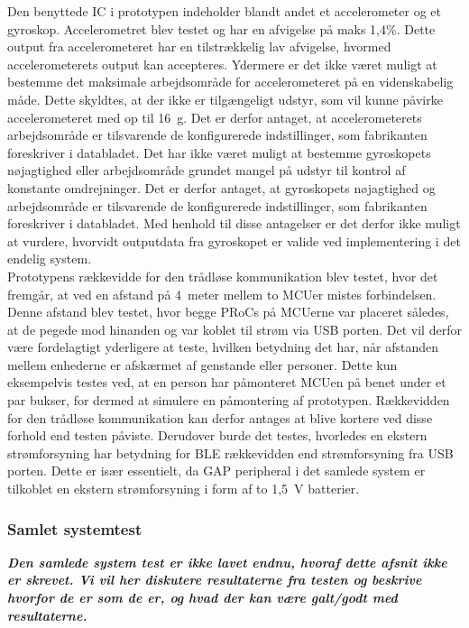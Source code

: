 Den benyttede IC i prototypen indeholder blandt andet et accelerometer og et gyroskop. Accelerometret blev testet og har en afvigelse på maks 1,4\%. Dette output fra accelerometeret har en tilstrækkelig lav afvigelse, hvormed accelerometerets output kan accepteres. Ydermere er det ikke været muligt at bestemme det maksimale arbejdsområde for accelerometeret på en videnskabelig måde. Dette skyldtes, at der ikke er tilgængeligt udstyr, som vil kunne påvirke accelerometeret med op til 16~g. Det er derfor antaget, at accelerometerets arbejdsområde er tilsvarende de konfigurerede indstillinger, som fabrikanten foreskriver i databladet. Det har ikke været muligt at bestemme gyroskopets nøjagtighed eller arbejdsområde grundet mangel på udstyr til kontrol af konstante omdrejninger. Det er derfor antaget, at gyroskopets nøjagtighed og arbejdsområde er tilsvarende de konfigurerede indstillinger, som fabrikanten foreskriver i databladet. Med henhold til disse antagelser er det derfor ikke muligt at vurdere, hvorvidt outputdata fra gyroskopet er valide ved implementering i det endelig system. \\
Prototypens rækkevidde for den trådløse kommunikation blev testet, hvor det fremgår, at ved en afstand på 4~meter mellem to MCUer mistes forbindelsen. Denne afstand blev testet, hvor begge PRoCs på MCUerne var placeret således, at de pegede mod hinanden og var koblet til strøm via USB porten. Det vil derfor være fordelagtigt yderligere at teste, hvilken betydning det har, når afstanden mellem enhederne er afskærmet af genstande eller personer. Dette kun eksempelvis testes ved, at en person har påmonteret MCUen på benet under et par bukser, for dermed at simulere en påmontering af prototypen. Rækkevidden for den trådløse kommunikation kan derfor antages at blive kortere ved disse forhold end testen påviste. Derudover burde det testes, hvorledes en ekstern strømforsyning har betydning for BLE rækkevidden end strømforsyning fra USB porten. Dette er især essentielt, da GAP peripheral i det samlede system er tilkoblet en ekstern strømforsyning i form af to 1,5~V batterier.

\subsubsection{Samlet systemtest}
\textbf{\textit{Den samlede system test er ikke lavet endnu, hvoraf dette afsnit ikke er skrevet. Vi vil her diskutere resultaterne fra testen og beskrive hvorfor de er som de er, og hvad der kan være galt/godt med resultaterne.}}

